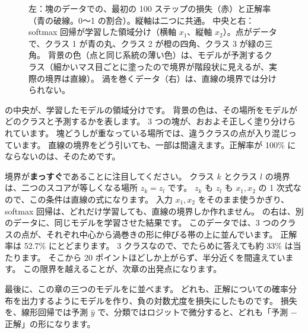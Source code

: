 \begin{figure}[tbp]
\caption{左：塊のデータでの、最初の 100 ステップの損失（赤）と正解率（青の破線。0〜1 の割合）。縦軸は二つに共通。
中央と右：softmax 回帰が学習した領域分け（横軸 $x_1$、縦軸 $x_2$）。点がデータで、クラス 1 が青の丸、クラス 2 が橙の四角、クラス 3 が緑の三角。
背景の色（点と同じ系統の薄い色）は、モデルが予測するクラス（細かいマス目ごとに塗ったので境界が階段状に見えるが、実際の境界は直線）。
渦を巻くデータ（右）は、直線の境界では分けられない。}
\label{fig:ml-blobs}
\end{figure}

の中央が、学習したモデルの領域分けです。
背景の色は、その場所をモデルがどのクラスと予測するかを表します。
3 つの塊が、おおよそ正しく塗り分けられています。
塊どうしが重なっている場所では、違うクラスの点が入り混じっています。
直線の境界をどう引いても、一部は間違えます。正解率が 100\% にならないのは、そのためです。

境界が\textbf{まっすぐ}であることに注目してください。
クラス $k$ とクラス $l$ の境界は、二つのスコアが等しくなる場所 $z_k = z_l$ です。
$z_k$ も $z_l$ も $x_1, x_2$ の 1 次式なので、この条件は直線の式になります。
入力 $x_1, x_2$ をそのまま使うかぎり、softmax 回帰は、どれだけ学習しても、直線の境界しか作れません。
の右は、別のデータに、同じモデルを学習させた結果です。
このデータでは、3 つのクラスの点が、それぞれ中心から渦巻きの形に伸びる帯の上に並んでいます。
正解率は 52.7\% にとどまります。
3 クラスなので、でたらめに答えても約 33\% は当たります。
そこから 20 ポイントほどしか上がらず、半分近くを間違えています。
この限界を越えることが、次章の出発点になります。

最後に、この章の三つのモデルをに並べます。
どれも、正解についての確率分布を出力するようにモデルを作り、負の対数尤度を損失にしたものです。
損失を、線形回帰では予測 $\hat{y}$ で、分類ではロジットで微分すると、どれも「予測 $-$ 正解」の形になります。


